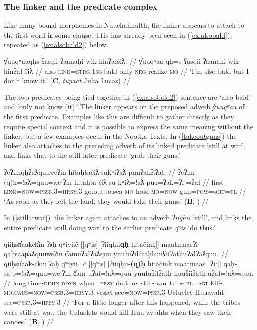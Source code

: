 \subsubsection{The linker and the predicate complex} \label{sec:link:2p}

Like many bound morphemes in Nuuchahnulth, the linker appears to attach to the first word in some clause. This has already been seen in (\ref{ex:alsobald}), repeated as (\ref{ex:alsobald2}) below.

\ex \label{ex:alsobald2}
\begingl
\glpreamble y̓uuqʷaaqḥs ʕasqii ʔaanaḥi wik hinʔałšiƛ. //
\gla y̓uuqʷaa-qḥ=s ʕasqii ʔaanaḥi wik hinʔał-šiƛ //
\glb also-\textsc{link}=\textsc{strg.1sg} bald only \textsc{neg} realize-\textsc{mo} //
\glft `I'm also bald but I don't know it.' (\textbf{C}, \textit{tupaat} Julia Lucas) //
\endgl
\xe

The two predicates being tied together in (\ref{ex:alsobald2}) sentence are `also bald' and `only not know (it).' The linker appears on the preposed adverb \textit{y̓uuqʷaa} of the first predicate.	 Examples like this are difficult to gather directly as they require special context and it is possible to express the same meaning without the linker, but a few examples occur in the Nootka Texts. In (\ref{takeoutguns}) the linker also attaches to the preceding adverb of its linked predicate `still at war', and links that to the still later predicate `grab their guns.'

\ex \label{takeoutguns}
\begingl
\glpreamble ʔeʔimqḥʔaƛquuweʔin hitaḥtačiƛ sukʷiʔaƛ puuʔakʔiʔał. //
\gla ʔeʔim-(q)ḥ=!aƛ=quu=weˑʔin hitaḥta-čiƛ su-kʷiƛ=!aƛ puu=ʔak=ʔiˑ=ʔał //
\glb first-\textsc{link}=\textsc{now}=\textsc{pssb.3}=\textsc{hrsy.3} go.out.to.sea-\textsc{mo} hold-\textsc{mo}=\textsc{now} gun=\textsc{poss}=\textsc{art}=\textsc{pl} //
\glft `As soon as they left the land, they would take their guns.' (\textbf{B}, \citealt[395]{sapir1955}) //
\endgl
\xe

In (\ref{stillatwar}), the linker again attaches to an adverb \textit{ʔiiqḥii} `still', and links the entire predicate `still doing war' to the earlier predicate \textit{qʷis} `do thus.'

\ex \label{stillatwar}
\begingl
\glpreamble qiiḥsn̓aakck̓in ʔaḥ qʷiyiič [[qʷis] [ʔiiqḥii\textbf{qḥ} hitačink]] maatmaasʔi qaḥsaap̓aƛquuweʔin č̓amuʔałʔaƛquu yuułuʔiłʔatḥ\footnotemark huuʕiiʔatḥuʔałʔaƛquu. //
\gla qiiḥsn̓aak-ck̓in ʔaḥ qʷiyii=č [[qʷis] [ʔiiqḥii-\textbf{(q)ḥ} hitačink maatmaas=ʔiˑ]] qaḥ-saˑp=!aƛ=quu=weˑʔin  č̓am-uʔał=!aƛ=quu yuułuʔiłʔatḥ huuʕiiʔatḥ-uʔał=!aƛ=quu. //
\glb long.time-\textsc{dimin} \textsc{ddyn} when=\textsc{hrsy} do.thus still- war tribe.\textsc{pl}=\textsc{art} kill-\textsc{mo.caus}=\textsc{now}=\textsc{pssb.3}=\textsc{hrsy.3} vessel-see=\textsc{now}=\textsc{pssb.3} Ucluelet Huuayaht-see=\textsc{pssb.3}=\textsc{hrsy.3} //
\glft `For a little longer after this happened, while the tribes were still at war, the Ucluelets would kill Huu-ay-ahts when they saw their canoes.' (\textbf{B}, \citealt[392]{sapir1955}) //
\endgl
\xe

